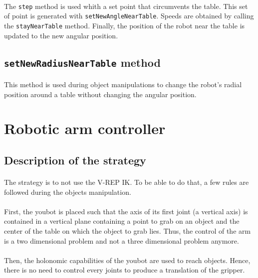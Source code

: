 \documentclass[12pt,a4paper]{article}
\begin{document}
\paragraph{} The \texttt{step} method is used whith a set point that circumvents the table. This set of point is generated with \texttt{setNewAngleNearTable}. Speeds are obtained by calling the \texttt{stayNearTable} method. Finally, the position of the robot near the table is updated to the new angular position.

\subsection{\texttt{setNewRadiusNearTable} method}
\paragraph{} This method is used during object manipulations to change the robot's radial position around a table without changing the angular position.


\section{Robotic arm controller}
\subsection{Description of the strategy}
\paragraph{} The strategy is to not use the V-REP IK. To be able to do that, a few rules are followed during the objects manipulation.

\paragraph{} First, the youbot is placed such that the axis of its first joint (a vertical axis) is contained in a  vertical plane containing a point to grab on an object and the center of the table on which the object to grab lies. Thus, the control of the arm is a two dimensional problem and not a three dimensional problem anymore.

\paragraph{} Then, the holonomic capabilities of the youbot are used to reach objects. Hence, there is no need to control every joints to produce a translation of the gripper.
\end{document}

